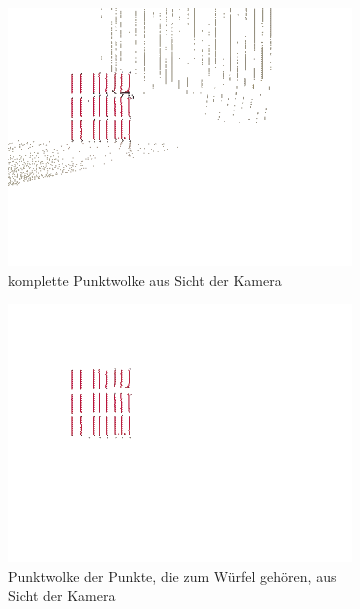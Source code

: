 \documentclass[ngerman,a4paper,parskip=half]{scrartcl}
\begin{document}
\begin{figure}[H]
	\centering
	\begin{subfigure}{0.45\textwidth}
		\includegraphics[width=\textwidth,frame,trim=0 120 0 20,clip]{includes/diff_red_cam.png}
		\caption{komplette Punktwolke aus Sicht der Kamera}
	\end{subfigure}
	\hfill
	\begin{subfigure}{0.45\textwidth}
		\includegraphics[width=\textwidth,frame,trim=0 120 0 20,clip]{includes/diff_only_red_cam.png}
		\caption{Punktwolke der Punkte, die zum Würfel gehören, aus Sicht der Kamera}
	\end{subfigure}
	\begin{subfigure}{0.45\textwidth}

\end{subfigure}
\end{figure}
\end{document}
